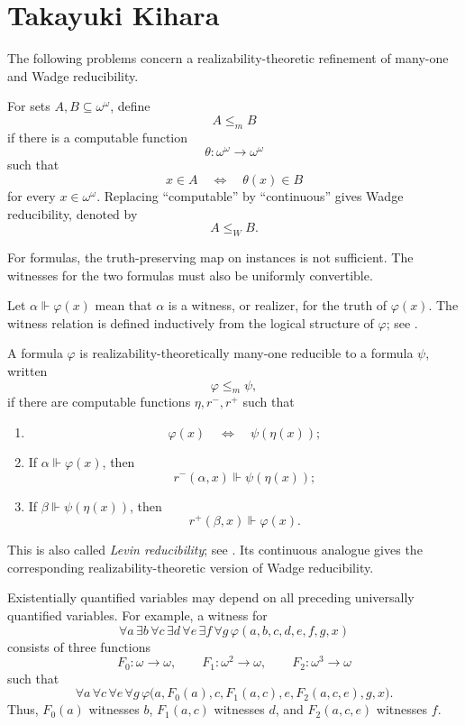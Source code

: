 \documentclass[11pt]{amsart}
\theoremstyle{definition}
\newcommand{\abstractauthor}[1]{\noindent\textbf{#1}\par\vspace{0.3\baselineskip}}
\newcommand{\abstractbody}[1]{\noindent #1 \par \vspace{\baselineskip}}
\begin{document}
\bigskip
\bigskip

\section{Takayuki Kihara}
\abstractbody{

The following problems concern a realizability-theoretic refinement of
many-one and Wadge reducibility.

For sets $A,B\subseteq\omega^\omega$, define
\[
    A\leq_m B
\]
if there is a computable function
\[
    \theta\colon\omega^\omega\to\omega^\omega
\]
such that
\[
    x\in A
    \quad\Longleftrightarrow\quad
    \theta(x)\in B
\]
for every $x\in\omega^\omega$. Replacing ``computable'' by
``continuous'' gives Wadge reducibility, denoted by
\[
    A\leq_W B.
\]

For formulas, the truth-preserving map on instances is not sufficient.
The witnesses for the two formulas must also be uniformly convertible.

Let $\alpha\Vdash\varphi(x)$ mean that $\alpha$ is a witness, or
realizer, for the truth of $\varphi(x)$. The witness relation is defined
inductively from the logical structure of $\varphi$; see
\cite[Definition~2.10]{KiharaHierarchy}.

A formula $\varphi$ is realizability-theoretically many-one reducible
to a formula $\psi$, written
\[
    \varphi\leq_m\psi,
\]
if there are computable functions $\eta,r^{-},r^{+}$ such that
\begin{enumerate}
    \item[(1)]
    \[
        \varphi(x)
        \quad\Longleftrightarrow\quad
        \psi(\eta(x));
    \]

    \item[(2)] If $\alpha\Vdash\varphi(x)$, then
    \[
        r^{-}(\alpha,x)\Vdash\psi(\eta(x));
    \]

    \item[(3)] If $\beta\Vdash\psi(\eta(x))$, then
    \[
        r^{+}(\beta,x)\Vdash\varphi(x).
    \]
\end{enumerate}
This is also called \emph{Levin reducibility}; see
\cite[Definition~2.13]{KiharaHierarchy}. Its continuous analogue gives
the corresponding realizability-theoretic version of Wadge
reducibility.

Existentially quantified variables may depend on all preceding
universally quantified variables. For example, a witness for
\[
    \forall a\,\exists b\,\forall c\,\exists d\,
    \forall e\,\exists f\,\forall g\,
    \varphi(a,b,c,d,e,f,g,x)
\]
consists of three functions
\[
    F_0\colon\omega\to\omega,\qquad
    F_1\colon\omega^2\to\omega,\qquad
    F_2\colon\omega^3\to\omega
\]
such that
\[
    \forall a\,\forall c\,\forall e\,\forall g\,
    \varphi\bigl(
        a,F_0(a),
        c,F_1(a,c),
        e,F_2(a,c,e),
        g,x
    \bigr).
\]
Thus, $F_0(a)$ witnesses $b$, $F_1(a,c)$ witnesses $d$, and
$F_2(a,c,e)$ witnesses $f$.

}
\end{document}
